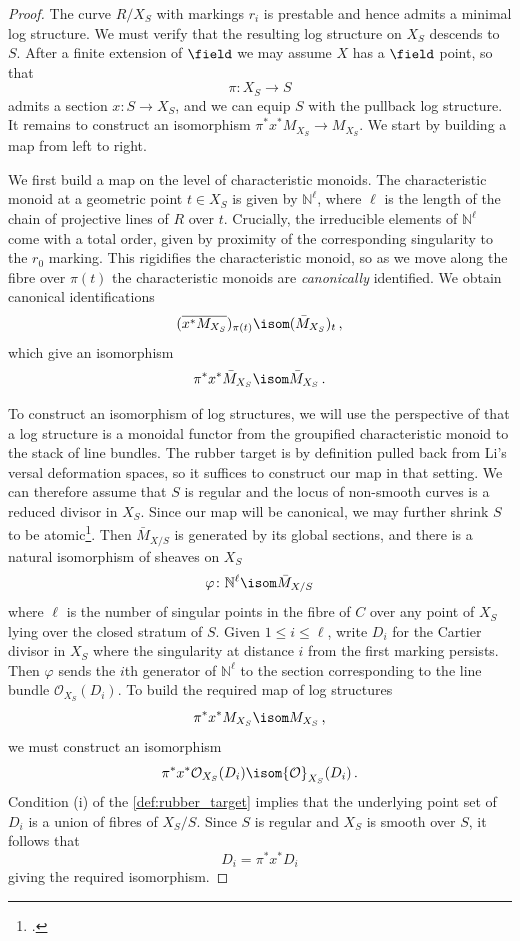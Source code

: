 \documentclass[a4paper,12pt]{article} %
\newcommand{\bb}[1]{{\mathbb{#1}}}
\newcommand{\ca}[1]{{\mathcal{#1}}}
\theoremstyle{definition}
\theoremstyle{plain}%
\renewcommand{\phi}{\varphi}
\begin{document}
\begin{proof}
The curve $R/X_S$ with markings $r_i$ is prestable and hence admits a minimal log structure. We must verify that the resulting log structure on $X_S$ descends to $S$. After a finite extension of $\field$ we may assume $X$ has a $\field$ point, so that $$\pi\colon X_S \to S$$
admits a section $x\colon S \to X_S$, and we can equip $S$ with the pullback log structure. It remains to construct an isomorphism $\pi^*x^* M_{X_S} \to M_{X_S}$. We start by building a map from left to right. %

We first build a map on the level of characteristic monoids. The characteristic monoid at a geometric point $t \in X_S$ is given by $\bb N^\ell$, where $\ell$ is the length of the chain of projective lines of $R$ over $t$. Crucially, the irreducible elements of $\bb N^\ell$ come with a total order, given by proximity of the corresponding singularity to the $r_0$ marking. This rigidifies the characteristic monoid, so as we move along the fibre over $\pi(t)$ the characteristic monoids are \emph{canonically} identified. We
obtain canonical identifications
$$(\overline{x^*M_{X_S}})_{\pi(t)} \isom (\bar{M}_{X_S})_t\, ,$$
which give an isomorphism
$$\pi^*x^* \bar M_{X_S} \isom \bar{M}_{X_S}\, .$$


 To construct an isomorphism of log structures, we will use the perspective of \cite[Section 3.1]{borne-vistoli} that a log structure is a monoidal functor from the groupified characteristic monoid to the stack of line bundles. The rubber target is by definition pulled back from  Li's versal deformation spaces, so it suffices to construct our map in that setting. We can
 therefore assume that $S$ is regular and the locus of non-smooth curves is a reduced divisor in $X_S$.
 Since our map will be canonical, we may further shrink $S$ to be atomic\footnote{\cite[Definition 2.2.4]{Abram_wise_birational}.}. Then $\bar M_{X/S}$ is generated by its global sections, and there is a natural isomorphism of sheaves on $X_S$
 $$\phi\colon \bb N^\ell \isom \bar M_{X/S}$$
 where $\ell$ is the number of singular points in the fibre of $C$ over any point of $X_S$ lying over the closed stratum of $S$. Given $1 \le i \le \ell$, write $D_i$ for the Cartier divisor in $X_S$ where the singularity at distance $i$ from the first marking persists. Then $\phi$ sends the $i$th generator  of $\bb N^\ell$ to the section corresponding to the line bundle $\ca O_{X_S}(D_i)$. To build the required map of log structures $$\pi^*x^*M_{X_S} \isom M_{X_S}\, ,$$ we must construct an isomorphism
$$\pi^*x^*\ca O_{X_S}(D_i) \isom \ca O_{X_S}(D_i)\, .$$
Condition (i) of the \cref{def:rubber_target} implies that the underlying point set of $D_i$ is a union of fibres of $X_S/S$. Since $S$ is regular and $X_S$ is smooth over $S$, it follows that
$$D_i = \pi^*x^*D_i$$
giving the required isomorphism. %


\end{proof}
\end{document}
